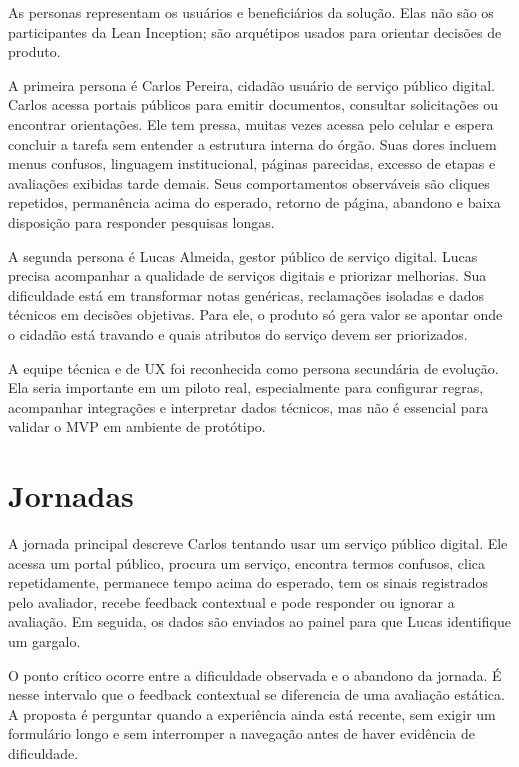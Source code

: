 As personas representam os usuários e beneficiários da solução. Elas não são os
participantes da Lean Inception; são arquétipos usados para orientar decisões de
produto.

A primeira persona é Carlos Pereira, cidadão usuário de serviço público digital.
Carlos acessa portais públicos para emitir documentos, consultar solicitações ou
encontrar orientações. Ele tem pressa, muitas vezes acessa pelo celular e espera
concluir a tarefa sem entender a estrutura interna do órgão. Suas dores incluem
menus confusos, linguagem institucional, páginas parecidas, excesso de etapas e
avaliações exibidas tarde demais. Seus comportamentos observáveis são cliques
repetidos, permanência acima do esperado, retorno de página, abandono e baixa
disposição para responder pesquisas longas.

A segunda persona é Lucas Almeida, gestor público de serviço digital. Lucas
precisa acompanhar a qualidade de serviços digitais e priorizar melhorias. Sua
dificuldade está em transformar notas genéricas, reclamações isoladas e dados
técnicos em decisões objetivas. Para ele, o produto só gera valor se apontar
onde o cidadão está travando e quais atributos do serviço devem ser priorizados.

A equipe técnica e de UX foi reconhecida como persona secundária de evolução.
Ela seria importante em um piloto real, especialmente para configurar regras,
acompanhar integrações e interpretar dados técnicos, mas não é essencial para
validar o MVP em ambiente de protótipo.

\section{Jornadas}

A jornada principal descreve Carlos tentando usar um serviço público digital.
Ele acessa um portal público, procura um serviço, encontra termos confusos,
clica repetidamente, permanece tempo acima do esperado, tem os sinais registrados
pelo avaliador, recebe feedback contextual e pode responder ou ignorar a
avaliação. Em seguida, os dados são enviados ao painel para que Lucas identifique
um gargalo.

O ponto crítico ocorre entre a dificuldade observada e o abandono da jornada. É
nesse intervalo que o feedback contextual se diferencia de uma avaliação
estática. A proposta é perguntar quando a experiência ainda está recente, sem
exigir um formulário longo e sem interromper a navegação antes de haver evidência
de dificuldade.

